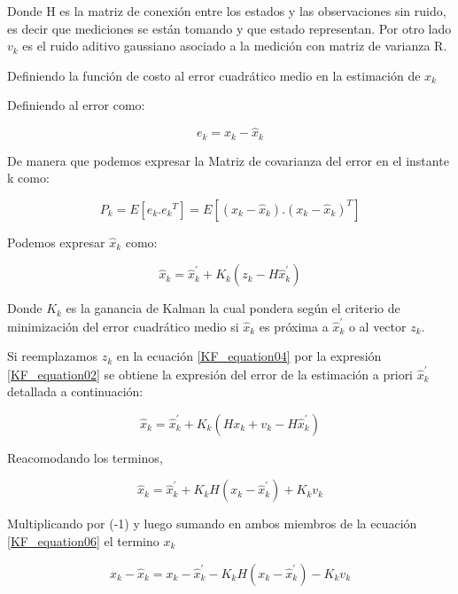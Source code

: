 \documentclass[10pt,a4paper]{article}
\begin{document}
Donde H es la matriz de conexión entre los estados y las observaciones sin
ruido, es decir que mediciones se están tomando y que estado representan. Por
otro lado $v_{k}$ es el ruido aditivo gaussiano asociado a la medición con
matriz de varianza R.

Definiendo la función de costo al error cuadrático medio en la estimación de
$x_k$ 

Definiendo al error como: 

\begin{equation}
    e_{k} = x_k  - \hat{x}_k
    \label{KF_error}
\end{equation}	

De manera que podemos expresar la Matriz de covarianza del error en el instante
k como:

\begin{equation}
    P_{k} = E[e_k.{e_k}^{T}] = E[(x_k-\hat{x}_k).(x_k-\hat{x}_k)^{T}]
    \label{KF_equation03}
\end{equation}	

Podemos expresar $\hat{x}_k$ como: 

\begin{equation}
    \hat{x}_k = \hat{x}^\prime_k + K_k (z_k - H\hat{x}^\prime_k)
    \label{KF_equation04}
\end{equation}	

Donde $K_k$ es la ganancia de Kalman la cual pondera según el criterio de
minimización del error cuadrático medio si $\hat{x}_k$ es próxima a
$\hat{x}^\prime_k$ o al vector $z_k$.

Si reemplazamos $z_k$ en la ecuación \ref{KF_equation04} por la expresión
\ref{KF_equation02} se obtiene la expresión del error de la estimación a priori
$\hat{x}^\prime_k$ detallada a continuación:

\begin{equation}
    \hat{x}_k = \hat{x}^\prime_k + K_k (Hx_{k} + v_{k} - H\hat{x}^\prime_k)
    \label{KF_equation05}
\end{equation}	

Reacomodando los terminos, 

\begin{equation}
    \hat{x}_k = \hat{x}^\prime_k + K_k H (x_{k}  - \hat{x}^\prime_k) + K_kv_{k}
    \label{KF_equation06}
\end{equation}	

Multiplicando por (-1) y luego sumando en ambos miembros de la ecuación
\ref{KF_equation06} el termino $x_k$ 

\begin{equation}
    x_k - \hat{x}_k = x_{k} -\hat{x}^\prime_k - K_k H (x_{k}  - \hat{x}^\prime_k) - K_kv_{k}
    \label{KF_equation08}
\end{equation}	
\end{document}
